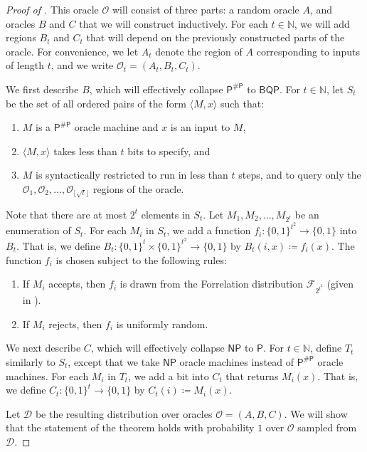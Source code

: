 \documentclass[10pt,a4paper]{article}
\newcommand{\Naturals}{\mathbb{N}}
\begin{document}
\begin{proof}[Proof of ]
This oracle $\mathcal{O}$ will consist of three parts: a random oracle $A$, and oracles $B$ and $C$ that we will construct inductively. For each $t \in \Naturals$, we will add regions $B_t$ and $C_t$ that will depend on the previously constructed parts of the oracle. For convenience, we let $A_t$ denote the region of $A$ corresponding to inputs of length $t$, and we write $\mathcal{O}_t = (A_t, B_t, C_t)$.

We first describe $B$, which will effectively collapse $\mathsf{P}^\mathsf{\# P}$ to $\mathsf{BQP}$. For $t \in \Naturals$, let $S_t$ be the set of all ordered pairs of the form $\langle M, x \rangle$ such that:
\begin{enumerate}
\item $M$ is a $\mathsf{P}^\mathsf{\# P}$ oracle machine and $x$ is an input to $M$,
\item $\langle M, x \rangle$ takes less than $t$ bits to specify, and
\item $M$ is syntactically restricted to run in less than $t$ steps, and to query only the $\mathcal{O}_1, \mathcal{O}_2, \ldots, \mathcal{O}_{\lfloor \sqrt{t} \rfloor}$ regions of the oracle.
\end{enumerate}
Note that there are at most $2^t$ elements in $S_t$. Let $M_1, M_2, \ldots, M_{2^t}$ be an enumeration of $S_t$. For each $M_i$ in $S_t$, we add a function $f_i: \{0,1\}^{t^2} \to \{0,1\}$ into $B_t$. That is, we define $B_t: \{0,1\}^t \times \{0,1\}^{t^2} \to \{0,1\}$ by $B_t(i, x) \coloneqq f_i(x)$. The function $f_i$ is chosen subject to the following rules:
\begin{enumerate}
\item If $M_i$ accepts, then $f_i$ is drawn from the Forrelation distribution $\mathcal{F}_{2^{t^2}}$ (given in ).
\item If $M_i$ rejects, then $f_i$ is uniformly random.
\end{enumerate}
We next describe $C$, which will effectively collapse $\mathsf{NP}$ to $\mathsf{P}$. For $t \in \Naturals$, define $T_t$ similarly to $S_t$, except that we take $\mathsf{NP}$ oracle machines instead of $\mathsf{P}^\mathsf{\# P}$ oracle machines. For each $M_i$ in $T_t$, we add a bit into $C_t$ that returns $M_i(x)$. That is, we define $C_t: \{0,1\}^t \to \{0,1\}$ by $C_t(i) \coloneqq M_i(x)$.

Let $\mathcal{D}$ be the resulting distribution over oracles $\mathcal{O} = (A, B, C)$. We will show that the statement of the theorem holds with probability $1$ over $\mathcal{O}$ sampled from $\mathcal{D}$.


\end{proof}
\end{document}
